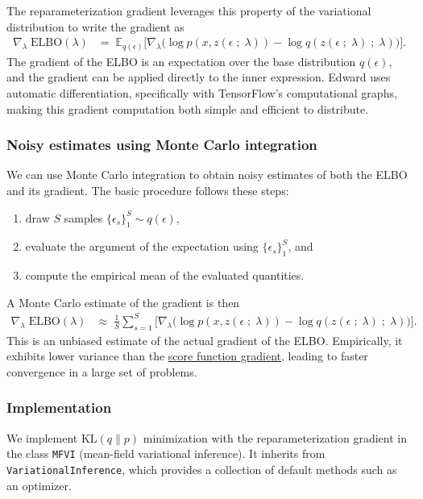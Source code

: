 The reparameterization gradient leverages this property of the
variational distribution to write the gradient as
\begin{align*}
  \nabla_\lambda\;
  \text{ELBO}(\lambda)
  &=\;
  \mathbb{E}_{q(\epsilon)}
  \big[
  \nabla_\lambda
  \big(
  \log p(x, z(\epsilon \;;\; \lambda))
  -
  \log q(z(\epsilon \;;\; \lambda) \;;\;\lambda)
  \big)
  \big].
\end{align*}
The gradient of the ELBO is an expectation over the base
distribution $q(\epsilon)$, and the gradient can be applied directly
to the inner expression.
Edward uses automatic differentiation, specifically with TensorFlow's
computational graphs, making this gradient computation both simple and
efficient to distribute.

\subsubsection{Noisy estimates using Monte Carlo integration}

We can use Monte Carlo integration to obtain noisy estimates of both the ELBO
and its gradient. The basic procedure follows these steps:
\begin{enumerate}
  \item draw $S$ samples $\{\epsilon_s\}_1^S \sim q(\epsilon)$,
  \item evaluate the argument of the expectation using $\{\epsilon_s\}_1^S$, and
  \item compute the empirical mean of the evaluated quantities.
\end{enumerate}

A Monte Carlo estimate of the gradient is then
\begin{align*}
  \nabla_\lambda\;
  \text{ELBO}(\lambda)
  &\approx\;
  \frac{1}{S}
  \sum_{s=1}^{S}
  \big[
  \nabla_\lambda
  \big(
  \log p(x, z(\epsilon \;;\; \lambda))
  -
  \log q(z(\epsilon \;;\; \lambda) \;;\;\lambda)
  \big)
  \big].
\end{align*}
This is an unbiased estimate of the actual gradient of the ELBO. Empirically, it
exhibits lower variance than the
\href{tut_KLqp_score.html}{score function gradient}, leading to
faster convergence in a large set of problems.

\subsubsection{Implementation}

We implement $\text{KL}(q\|p)$ minimization with the
reparameterization gradient in the class \texttt{MFVI} (mean-field
variational inference). It inherits from
\texttt{VariationalInference}, which
provides a collection of default methods
such as an optimizer.

